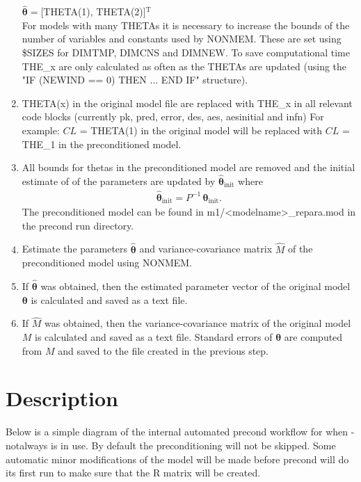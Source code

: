 \begin{enumerate}
        \indent $\hat{\boldsymbol{\theta}}=$[THETA(1), THETA(2)]$^\textrm{T}$\\
        For models with many THETAs it is necessary to increase the bounds of the number of variables and constants used by NONMEM. These are set using \$SIZES for DIMTMP, DIMCNS and DIMNEW. To save computational time THE\_x are only calculated as often as the THETAs are updated (using the "IF (NEWIND == 0) THEN ... END IF" structure).
    \item THETA(x) in the original model file are replaced with THE\_x in all relevant code blocks (currently pk, pred, error, des, aes, aesinitial and infn)
        For example: $CL$ = THETA(1) in the original model will be replaced with $CL$ = THE\_1 in the preconditioned model.

	\item All bounds for thetas in the preconditioned model are removed and the initial estimate of of the parameters are updated by $\hat{\boldsymbol{\theta}}_\textrm{init}$ where
	\begin{eqnarray*}
	    \hat{\boldsymbol{\theta}}_\textrm{init}= P^{-1} \,{\boldsymbol{\theta}}_\textrm{init}.
	\end{eqnarray*}
	The preconditioned model can be found in m1/<modelname>\_repara.mod in the precond run directory.
	\item Estimate the parameters $\hat{\boldsymbol{\theta}}$ and variance-covariance matrix $\hat{M}$ of the preconditioned model using NONMEM.
	\item If $\hat{\boldsymbol{\theta}}$ was obtained, then the estimated parameter vector of the original model $\boldsymbol{\theta}$ is calculated and saved as a text file.
	\item If $\hat{M}$ was obtained, then the variance-covariance matrix of the original model $M$ is calculated and saved as a text file. Standard errors of $\boldsymbol{\theta}$ are computed from $M$ and saved to the file created in the previous step.
\end{enumerate}



\section{Description}

Below is a simple diagram of the internal automated precond workflow for when -notalways is in use. By default the preconditioning will not be skipped. Some automatic minor modifications of the model will be made before precond will do its first run to make sure that the R matrix will be created.

